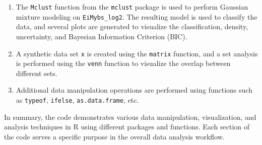 \documentclass{article}
\begin{document}
\begin{enumerate}
\item The \texttt{Mclust} function from the \texttt{mclust} package is used to perform Gaussian mixture modeling on \texttt{EiMybs\_log2}. The resulting model is used to classify the data, and several plots are generated to visualize the classification, density, uncertainty, and Bayesian Information Criterion (BIC).

\item A synthetic data set \texttt{x} is created using the \texttt{matrix} function, and a set analysis is performed using the \texttt{venn} function to visualize the overlap between different sets.

\item Additional data manipulation operations are performed using functions such as \texttt{typeof}, \texttt{ifelse}, \texttt{as.data.frame}, etc.
\end{enumerate}

In summary, the code demonstrates various data manipulation, visualization, and analysis techniques in R using different packages and functions. Each section of the code serves a specific purpose in the overall data analysis workflow.
\end{document}

